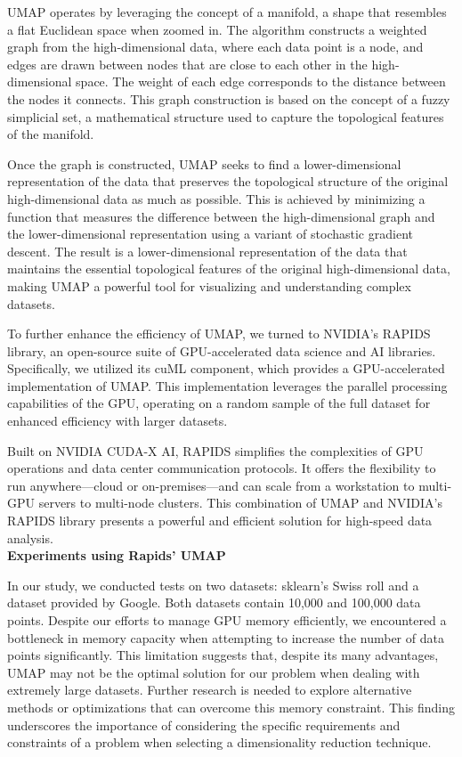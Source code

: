 \begin{itemize}
	      UMAP operates by leveraging the concept of a manifold, a shape that resembles a flat Euclidean space when zoomed in. The algorithm constructs a weighted graph from the high-dimensional data, where each data point is a node, and edges are drawn between nodes that are close to each other in the high-dimensional space. The weight of each edge corresponds to the distance between the nodes it connects. This graph construction is based on the concept of a fuzzy simplicial set, a mathematical structure used to capture the topological features of the manifold. 
	      	      
	      Once the graph is constructed, UMAP seeks to find a lower-dimensional representation of the data that preserves the topological structure of the original high-dimensional data as much as possible. This is achieved by minimizing a function that measures the difference between the high-dimensional graph and the lower-dimensional representation using a variant of stochastic gradient descent. The result is a lower-dimensional representation of the data that maintains the essential topological features of the original high-dimensional data, making UMAP a powerful tool for visualizing and understanding complex datasets.
	      	      
	      To further enhance the efficiency of UMAP, we turned to NVIDIA’s RAPIDS library, an open-source suite of GPU-accelerated data science and AI libraries. Specifically, we utilized its cuML component, which provides a GPU-accelerated implementation of UMAP. This implementation leverages the parallel processing capabilities of the GPU, operating on a random sample of the full dataset for enhanced efficiency with larger datasets. 
	      	      
	      Built on NVIDIA CUDA-X AI, RAPIDS simplifies the complexities of GPU operations and data center communication protocols. It offers the flexibility to run anywhere—cloud or on-premises—and can scale from a workstation to multi-GPU servers to multi-node clusters. This combination of UMAP and NVIDIA's RAPIDS library presents a powerful and efficient solution for high-speed data analysis.\\

\textbf{ Experiments using Rapids' UMAP}

In our study, we conducted tests on two datasets: sklearn’s Swiss roll and a dataset provided by Google. Both datasets contain 10,000 and 100,000 data points. Despite our efforts to manage GPU memory efficiently, we encountered a bottleneck in memory capacity when attempting to increase the number of data points significantly. This limitation suggests that, despite its many advantages, UMAP may not be the optimal solution for our problem when dealing with extremely large datasets. Further research is needed to explore alternative methods or optimizations that can overcome this memory constraint. This finding underscores the importance of considering the specific requirements and constraints of a problem when selecting a dimensionality reduction technique.



\end{itemize}
